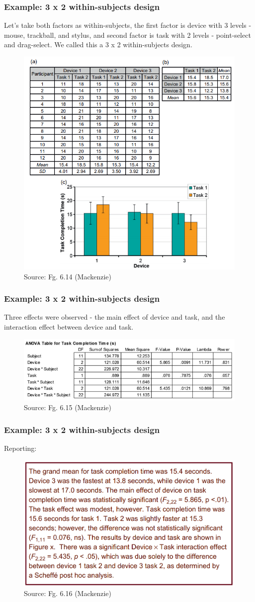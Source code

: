 \documentclass{beamer}
\begin{document}
\begin{frame}
	\footnotesize
	\frametitle{Example: 3 x 2 within-subjects design} 
	Let's take both factors as within-subjects, the first factor is device with 3 levels - mouse, trackball, and stylus, and second factor is task with 2 levels - point-select and drag-select.  We called this a 3 x 2 within-subjects design.
	\begin{figure}
		\includegraphics[width=0.43\linewidth]{2way}
		\caption{Source: Fg. 6.14 (Mackenzie)}
	\end{figure}
\end{frame}

\begin{frame}
	\footnotesize
	\frametitle{Example: 3 x 2 within-subjects design} 
	Three effects were observed - the main effect of device and task, and the interaction effect between device and task.
	\begin{figure}
		\includegraphics[width=0.9\linewidth]{2way-result}
		\caption{Source: Fg. 6.15 (Mackenzie)}
	\end{figure}
\end{frame}

\begin{frame}
	\frametitle{Example: 3 x 2 within-subjects design} 
	Reporting:
	\begin{figure}
		\includegraphics[width=0.7\linewidth]{2way-report}
		\caption{Source: Fg. 6.16 (Mackenzie)}
	\end{figure}
\end{frame}
\end{document}
